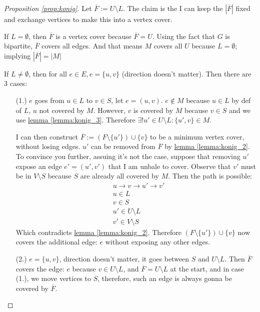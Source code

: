 \documentclass[]{article}
\theoremstyle{definition}
\begin{document}
    \begin{proof}[Proposition \ref*{prop:konig}]
        Let $\overline{F}:= U\setminus L$. The claim is the I can keep the $|\overline{F}|$ fixed and exchange vertices to make this into a vertex cover. 
        \par
        If $L= \emptyset$, then $\overline{F}$ is a vertex cover because $\overline{F} = U$. Using the fact that $G$ is bipartite, $\overline F$ covers all edges. And that means $M$ covers all $U$ because $L=\emptyset$; implying $|\overline{F}| = |M|$
        \par
        If $L\neq \emptyset$, then for all $e\in E, e = \{u, v\}$ (direction doesn't matter). Then there are 3 cases: 
        \begin{enumerate}
            \item [(1.)] $e$ goes from $u\in L$ to $v\in S$, let $e=(u, v)$. $e\not \in M$ because $u\in L$ by def of $L$, $u$ not covered by $M$. However, $v$ is covered by $M$ because $v\in S$ and we use \hyperref[lemma:konig_3]{lemma \ref*{lemma:konig_3}}. Therefore $\exists! u'\in U\setminus L: \{u', v\}\in M$. 
            \par
            I can then construct $\overline{F}:= (F\setminus\{u'\})\cup \{v\}$ to be a minimum vertex cover, without losing edges. $u'$ can be removed from $\overline{F}$ by \hyperref[lemma:konig_2]{lemma \ref*{lemma:konig_2}}. To convince you further, assuing it's not the case, suppose that removing $u'$ expose an edge $e'=(u', v')$ that I am unbale to cover. Observe that $v'$ must be in $V\setminus S$ because $S$ are already all covered by $M$. Then the path is possible: 
            \begin{align}
                & u\rightarrow v\rightarrow u' \rightarrow v'
                \\
                & u\in L
                \\
                & v\in S
                \\
                & u' \in U\setminus L
                \\
                & v'\in V\setminus S
            \end{align}
            Which contradicts \hyperref[lemma:konig_2]{lemma \ref*{lemma:konig_2}}. Therefore $(F\setminus\{u'\})\cup \{v\}$ now covers the additional edge: $e$ without exposing any other edges. 
            \item [(2.)] $e=\{u, v\}$, direction doesn't matter, it goes between $S$ and $U\setminus L$. Then $\overline{F}$ covers the edge: $e$ because $v\in U\setminus L$, and $\overline F = U\setminus L$ at the start, and in case (1.), we move vertices to $S$, therefore, such an edge is always gonna be covered by $\overline F$. 

\end{enumerate}
\end{proof}
\end{document}
